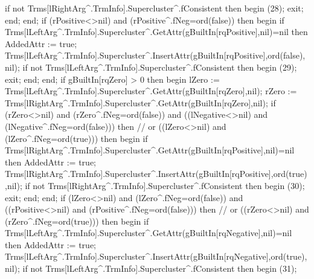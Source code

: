                      if not Trms[lRightArg^.TrmInfo].Supercluster^.fConsistent then
                     begin
                        (28);
                        exit;
                     end;
                  end;
                  if (rPositive<>nil) and (rPositive^.fNeg=ord(false)) then
                  begin
                     if Trms[lLeftArg^.TrmInfo].Supercluster^.GetAttr(gBuiltIn[rqPositive],nil)=nil
                     then AddedAttr := true;
                     Trms[lLeftArg^.TrmInfo].Supercluster^.InsertAttr(gBuiltIn[rqPositive],ord(false),nil);
                     if not Trms[lLeftArg^.TrmInfo].Supercluster^.fConsistent then
                     begin
                        (29);
                        exit;
                     end;
                  end;
                  if gBuiltIn[rqZero] > 0 then
                  begin
                     lZero := Trms[lLeftArg^.TrmInfo].Supercluster^.GetAttr(gBuiltIn[rqZero],nil);
                     rZero := Trms[lRightArg^.TrmInfo].Supercluster^.GetAttr(gBuiltIn[rqZero],nil);
                     if (rZero<>nil) and (rZero^.fNeg=ord(false)) and
                           ((lNegative<>nil) and (lNegative^.fNeg=ord(false))) then
                        // or ((lZero<>nil) and (lZero^.fNeg=ord(true))) then
                     begin
                        if Trms[lRightArg^.TrmInfo].Supercluster^.GetAttr(gBuiltIn[rqPositive],nil)=nil then AddedAttr := true;
                        Trms[lRightArg^.TrmInfo].Supercluster^.InsertAttr(gBuiltIn[rqPositive],ord(true),nil);
                        if not Trms[lRightArg^.TrmInfo].Supercluster^.fConsistent then
                        begin
                           (30);
                           exit;
                        end;
                     end;
                     if (lZero<>nil) and (lZero^.fNeg=ord(false)) and
                           ((rPositive<>nil) and (rPositive^.fNeg=ord(false))) then
                        // or ((rZero<>nil) and (rZero^.fNeg=ord(true))) then
                     begin
                        if Trms[lLeftArg^.TrmInfo].Supercluster^.GetAttr(gBuiltIn[rqNegative],nil)=nil
                        then AddedAttr := true;
                        Trms[lLeftArg^.TrmInfo].Supercluster^.InsertAttr(gBuiltIn[rqNegative],ord(true),nil);
                        if not Trms[lLeftArg^.TrmInfo].Supercluster^.fConsistent then
                        begin
                           (31);
